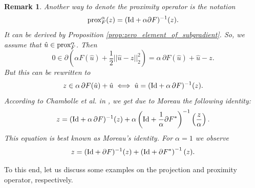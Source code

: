 \documentclass[abstracton]{scrreprt}
\newtheorem{remark}[theorem]{Remark}
\begin{document}
        \begin{remark}
            Another way to denote the proximity operator is the notation
                \begin{equation}
                    \textnormal{prox}^{\alpha}_{F}(z) = (\textnormal{Id} + \alpha \partial F)^{-1}(z).
                    \label{eq:proximity_operator_reloaded}
                \end{equation}
            It can be derived by Proposition \ref{prop:zero_element_of_subgradient}. So, we assume that $\hat{u} \in \textnormal{prox}^{\alpha}_{F}$. Then
                $$
                    0 \in \partial \left( \alpha F(\hat{u}) + \frac{1}{2} ||\hat{u} - z||_{2}^{2} \right) = \alpha \, \partial F(\hat{u}) + \hat{u} - z.
                $$
            But this can be rewritten to
                $$
                    z \in \alpha\,\partial F(\hat{u}) + \hat{u} \iff \hat{u} = (\textnormal{Id} + \alpha \, \partial F)^{-1}(z).
                $$
            According to Chambolle et al. in \cite{Chambolle-et-al-10}, we get due to Moreau the following identity:
                \begin{equation}
                    z = (\textnormal{Id} + \alpha \, \partial F)^{-1}(z) + \alpha \left( \textnormal{Id} + \frac{1}{\alpha} \partial F^{\ast} \right)^{-1} \left(\frac{z}{\alpha}\right).
                    \label{eq:moreau_identity_reloaded}
                \end{equation}
            This equation is best known as Moreau's identity. For $\alpha = 1$ we observe
                $$
                    z = (\textnormal{Id} + \partial F)^{-1}(z) + \left( \textnormal{Id} + \partial F^{\ast} \right)^{-1} (z).
                $$
        \end{remark}
        To this end, let us discuss some examples on the projection and proximity operator, respectively.
\end{document}
